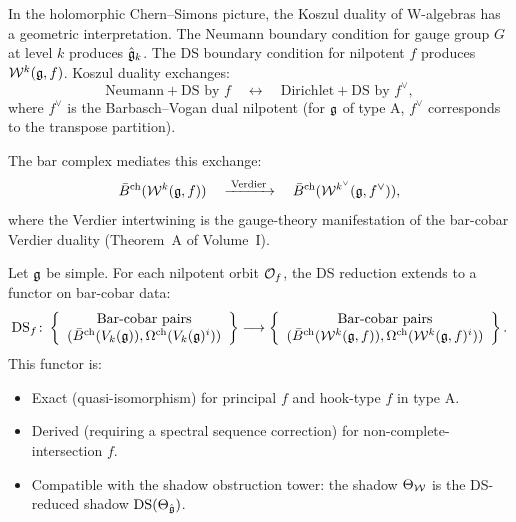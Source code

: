 \begin{construction}
In the holomorphic Chern--Simons picture, the Koszul duality of W-algebras
has a geometric interpretation. The Neumann boundary condition for
gauge group $G$ at level $k$ produces $\hat{\mathfrak{g}}_k$. The DS boundary
condition for nilpotent $f$ produces $\mathcal{W}^k(\mathfrak{g}, f)$. Koszul duality
exchanges:
\[
\text{Neumann} + \text{DS by } f
\quad \longleftrightarrow \quad
\text{Dirichlet} + \text{DS by } f^\vee,
\]
where $f^\vee$ is the Barbasch--Vogan dual nilpotent (for $\mathfrak{g}$ of
type A, $f^\vee$ corresponds to the transpose partition).

The bar complex mediates this exchange:
\[
\bar{B}^{\mathrm{ch}}(\mathcal{W}^k(\mathfrak{g}, f))
 \quad \xrightarrow{\;\text{Verdier}\;} \quad
 \bar{B}^{\mathrm{ch}}(\mathcal{W}^{k^\vee}(\mathfrak{g}, f^\vee)),
\]
where the Verdier intertwining is the gauge-theory manifestation of
the bar-cobar Verdier duality (Theorem~A of Volume~I).
\end{construction}

\begin{conjecture}
Let $\mathfrak{g}$ be simple. For each nilpotent orbit $\mathcal{O}_f$, the
DS reduction extends to a functor on bar-cobar data:
\[
\mathrm{DS}_f \colon
 \left\{
 \begin{array}{c}
 \text{Bar-cobar pairs} \\
 (\bar{B}^{\mathrm{ch}}(V_k(\mathfrak{g})), \Omega^{\mathrm{ch}}(V_k(\mathfrak{g})^i))
 \end{array}
 \right\}
 \longrightarrow
 \left\{
 \begin{array}{c}
 \text{Bar-cobar pairs} \\
 (\bar{B}^{\mathrm{ch}}(\mathcal{W}^k(\mathfrak{g},f)), \Omega^{\mathrm{ch}}(\mathcal{W}^k(\mathfrak{g},f)^i))
 \end{array}
 \right\}.
\]
This functor is:
\begin{itemize}
\item Exact (quasi-isomorphism) for principal $f$ and hook-type $f$ in type A.
\item Derived (requiring a spectral sequence correction) for
 non-complete-intersection $f$.
\item Compatible with the shadow obstruction tower: the shadow $\Theta_{\mathcal{W}}$ is the
 DS-reduced shadow $\mathrm{DS}(\Theta_{\hat{\mathfrak{g}}})$.
\end{itemize}
\end{conjecture}



